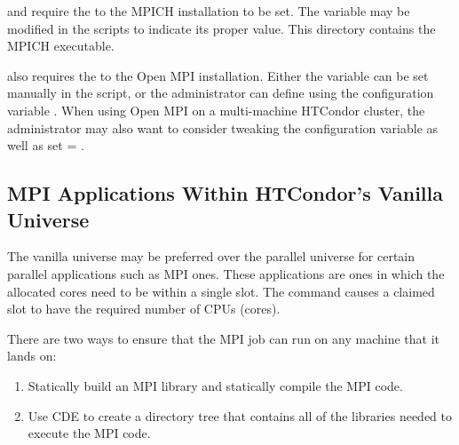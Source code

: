  and  require the  to the MPICH installation to be set.
The variable  may be modified in the scripts to indicate its proper value.
This directory contains the MPICH  executable.

 also requires the  to the Open MPI installation.
Either the variable  can be set manually in the script,
or the administrator can define 
using the configuration variable .
When using Open MPI on a multi-machine HTCondor cluster,
the administrator may also want to consider tweaking the
 configuration variable
as well as set  = .


\subsection{\label{sec:parallel-mpi-submit-single}MPI Applications Within HTCondor's Vanilla Universe}

The vanilla universe may be preferred over the parallel universe
for certain parallel applications such as MPI ones.
These applications are ones in which the allocated cores need
to be within a single slot.
The  command causes a claimed slot to
have the required number of CPUs (cores).

There are two ways to ensure that the MPI job can run 
on any machine that it lands on:
\begin{enumerate}
\item Statically build an MPI library and statically compile the MPI code.
\item Use CDE to create a directory tree that contains all of the libraries 
needed to execute the MPI code.
\end{enumerate}

